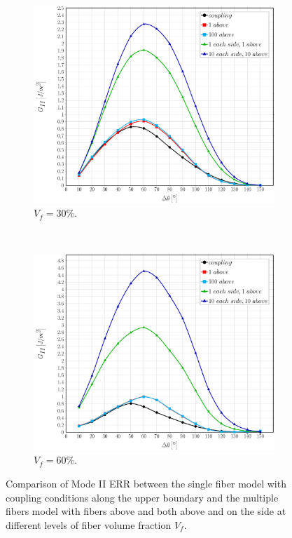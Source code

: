 \documentclass[review]{elsarticle}
\begin{document}
\begin{figure}[!h]
\centering
    \begin{subfigure}[b]{0.475\textwidth}
        \includegraphics[width=\textwidth]{comparecouplingabovesidefibers-vf30-GII.pdf}
        \caption{$V_{f}=30\%$.}\label{subfig:comparisoncoupling30MII}
    \end{subfigure} ~
    \begin{subfigure}[b]{0.475\textwidth}
        \includegraphics[width=\textwidth]{comparecouplingabovesidefibers-vf60-GII.pdf}
        \caption{$V_{f}=60\%$.}\label{subfig:comparisoncoupling60MII}
    \end{subfigure}

\caption{Comparison of Mode II ERR between the single fiber model with coupling conditions along the upper boundary and the multiple fibers model with fibers above and both above and on the side at different levels of fiber volume fraction $V_{f}$.}\label{fig:comparisoncouplingMII}
\end{figure}
\end{document}
